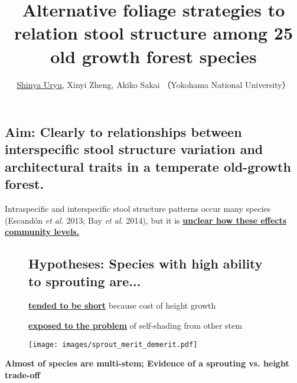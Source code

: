 \documentclass[a0, 25, plainboxedsections]{sciposter} %
\title{\textcolor{Blue1}{Alternative foliage strategies to relation stool structure among 25 old growth forest species}} %
\author{\underline{Shinya Uryu}, Xinyi Zheng, Akiko Sakai （Yokohama National University） \normalsize{\faEnvelope \hspace{0.02em} \fontspec{HelveticaNeue-Italic}{suika1127@gmail.com}}}
\begin{document}
\maketitle
\vspace{-2em}
\begin{multicols}{2}
\begin{mdframed}[style=section.frame]
  \centering\LARGE\textbf{\color{white}{INTRODUCTION}}
\end{mdframed}

\vspace{-0.6em}\subsection*{Aim: Clearly to relationships between interspecific stool structure variation and architectural traits in a temperate old-growth forest.}

Intraspecific and interspecific stool structure patterns occur many species {\footnotesize(Escandón \textit{et al.} 2013; Bay \textit{et al.} 2014)}, but it is \textbf{\underline{unclear how these effects community levels.}}

\vspace{-0.6em}\begin{figure}
 \begin{minipage}{0.6\hsize}
 \subsection*{Hypotheses: Species with high ability to sprouting are...}
   \underline{\textbf{tended to be short}} because cost of height growth
  
   \underline{\textbf{exposed to the problem}} of self-shading from other stem

 \end{minipage}
 \begin{minipage}{0.4\hsize}
  \centering
   \texttt{[image: images/sprout\_merit\_demerit.pdf]}  
 \end{minipage}
\end{figure}

\columnbreak
\begin{mdframed}[style=conclusion.frame,frametitle={\textbf{\Large{\faFlagAlt \vspace{0.02em} CONCLUSION: {Sprout ability is  against tree height is は樹高と背反的に進化しており、\\\hspace*{2.8em}群集の中に多様な萌芽性をもつ種が存在する}}}}]
  \vspace{0.4em}
  \flushleft
  \normalsize{
  \textbf{Almost of species are multi-stem; Evidence of a sprouting vs. height trade-off}
  
}
\end{mdframed}
\end{multicols}
\end{document}
